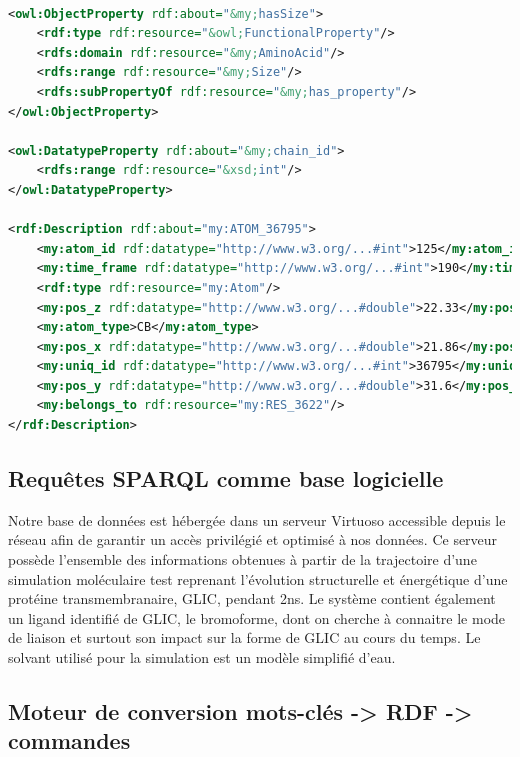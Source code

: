 \begin{lstlisting}[language=XML, caption=Exemple de triplets RDF présents dans notre base de données]

<owl:ObjectProperty rdf:about="&my;hasSize">
    <rdf:type rdf:resource="&owl;FunctionalProperty"/>
    <rdfs:domain rdf:resource="&my;AminoAcid"/>
    <rdfs:range rdf:resource="&my;Size"/>
    <rdfs:subPropertyOf rdf:resource="&my;has_property"/>
</owl:ObjectProperty>

<owl:DatatypeProperty rdf:about="&my;chain_id">
    <rdfs:range rdf:resource="&xsd;int"/>
</owl:DatatypeProperty>

<rdf:Description rdf:about="my:ATOM_36795">
	<my:atom_id rdf:datatype="http://www.w3.org/...#int">125</my:atom_id>
	<my:time_frame rdf:datatype="http://www.w3.org/...#int">190</my:time_frame>
	<rdf:type rdf:resource="my:Atom"/>
	<my:pos_z rdf:datatype="http://www.w3.org/...#double">22.33</my:pos_z>
	<my:atom_type>CB</my:atom_type>
	<my:pos_x rdf:datatype="http://www.w3.org/...#double">21.86</my:pos_x>
	<my:uniq_id rdf:datatype="http://www.w3.org/...#int">36795</my:uniq_id>
	<my:pos_y rdf:datatype="http://www.w3.org/...#double">31.6</my:pos_y>
	<my:belongs_to rdf:resource="my:RES_3622"/>
</rdf:Description>

\end{lstlisting}

\subsection{Requêtes SPARQL comme base logicielle}

Notre base de données est hébergée dans un serveur Virtuoso accessible depuis le réseau afin de garantir un accès privilégié et optimisé à nos données. Ce serveur possède l'ensemble des informations obtenues à partir de la trajectoire d'une simulation moléculaire test reprenant l'évolution structurelle et énergétique d'une protéine transmembranaire, GLIC, pendant 2ns. Le système contient également un ligand identifié de GLIC, le bromoforme, dont on cherche à connaitre le mode de liaison et surtout son impact sur la forme de GLIC au cours du temps. Le solvant utilisé pour la simulation est un modèle simplifié d'eau.

\subsection{Moteur de conversion mots-clés -> RDF -> commandes}

